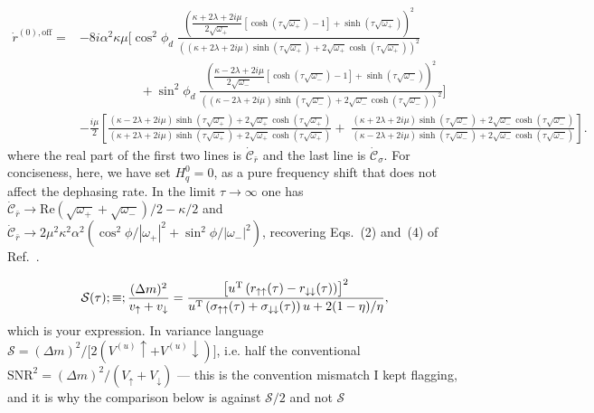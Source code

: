 \documentclass[%
reprint,
superscriptaddress,
nofootinbib,
 amsmath,amssymb,
prx,
floatfix,
]{revtex4-2}
\begin{document}
\begin{align}
   \dot{r}^{(0), \text{off}} =& - 8 i \alpha^{2} \kappa \mu \Big[ 
    \cos^{2} \phi_d \;
    \frac{\left( \dfrac{\kappa + 2 \lambda + 2 i \mu}{2 \sqrt{\omega_{+}}}
    \left[ \cosh \left( \tau \sqrt{\omega_{+}} \right) - 1 \right]
    + \sinh \left( \tau \sqrt{\omega_{+}} \right) \right)^{2}}
    {\left( (\kappa + 2 \lambda + 2 i \mu) \sinh \left( \tau \sqrt{\omega_{+}} \right)
    + 2 \sqrt{\omega_{+}} \cosh \left( \tau \sqrt{\omega_{+}} \right) \right)^{2}} \\
    &\hspace{2cm}
    + \sin^{2} \phi_d \;
    \frac{\left( \dfrac{\kappa - 2 \lambda + 2 i \mu}{2 \sqrt{\omega_{-}}}
    \left[ \cosh \left( \tau \sqrt{\omega_{-}} \right) - 1 \right]
    + \sinh \left( \tau \sqrt{\omega_{-}} \right) \right)^{2}}
    {\left( (\kappa - 2 \lambda + 2 i \mu) \sinh \left( \tau \sqrt{\omega_{-}} \right)
    + 2 \sqrt{\omega_{-}} \cosh \left( \tau \sqrt{\omega_{-}} \right) \right)^{2}} \Big] \nonumber \\
 &- \frac{i \mu}{2} \left[ 
    \frac{(\kappa - 2 \lambda + 2 i \mu) \sinh \left( \tau \sqrt{\omega_{+}} \right)
    + 2 \sqrt{\omega_{+}} \cosh \left( \tau \sqrt{\omega_{+}} \right)}
    {(\kappa + 2 \lambda + 2 i \mu) \sinh \left( \tau \sqrt{\omega_{+}} \right)
    + 2 \sqrt{\omega_{+}} \cosh \left( \tau \sqrt{\omega_{+}} \right)} 
    + \;  \frac{(\kappa + 2 \lambda + 2 i \mu) \sinh \left( \tau \sqrt{\omega_{-}} \right)
    + 2 \sqrt{\omega_{-}} \cosh \left( \tau \sqrt{\omega_{-}} \right)}
    {(\kappa - 2 \lambda + 2 i \mu) \sinh \left( \tau \sqrt{\omega_{-}} \right)
    + 2 \sqrt{\omega_{-}} \cosh \left( \tau \sqrt{\omega_{-}} \right)} \right] \nonumber.
\end{align}
where the real part of the first two lines is $\dot{\mathcal{C}}_{\bar{r}}$ and  the last line is $\dot{\mathcal{C}}_{\sigma}$.
For conciseness, here, we have set $H_{q}^{0} = 0$, as a pure frequency shift that does not affect the dephasing rate.
In the limit $\tau \to \infty$ one has
$\dot{\mathcal{C}}_{\bar{r}}  \to \text{Re} \left( \sqrt{\omega_{+}} + \sqrt{\omega_{-}} \right) / 2 - \kappa / 2$
and
$\dot{\mathcal{C}}_{\bar{r}}  \to 2 \mu^{2} \kappa^{2} \alpha^{2}
\left( \cos^{2} \phi / | \omega_{+} |^{2} + \sin^{2} \phi / | \omega_{-} |^{2} \right)$,
recovering Eqs.~(2) and~(4) of Ref.~\cite{eddins_high_2019}.


$$\mathcal S(\tau);\equiv;\frac{(\Delta m)^2}{v_\uparrow+v_\downarrow}
=\frac{\left[u^{\rm T}\left(r_{\uparrow\uparrow}(\tau)-r_{\downarrow\downarrow}(\tau)\right)\right]^{2}}
{u^{\rm T}\left(\sigma_{\uparrow\uparrow}(\tau)+\sigma_{\downarrow\downarrow}(\tau)\right)u+2(1-\eta)/\eta},$$
which is your expression. In variance language $\mathcal S=(\Delta m)^2/\big[2(V^{(u)}\uparrow+V^{(u)}\downarrow)\big]$, i.e. half the conventional $\mathrm{SNR}^2=(\Delta m)^2/(V_\uparrow+V_\downarrow)$ — this is the convention mismatch I kept flagging, and it is why the comparison below is against $\mathcal S/2$ and not $\mathcal S$
\end{document}
